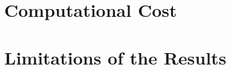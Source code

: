 \section{Computational Cost}
\label{sec:results_computational_cost}

\section{Limitations of the Results}
\label{sec:results_limitations}
